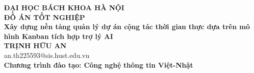 \documentclass[DoAn.tex]{subfiles}
\begin{document}
\begin{titlepage}
\thispagestyle{empty}
\begin{center}

{\textbf{\large{ĐẠI HỌC BÁCH KHOA HÀ NỘI}}}\\[3cm]

{\textbf{\huge{ ĐỒ ÁN TỐT NGHIỆP}}}\\[1cm]
{\textbf{\Large{Xây dựng nền tảng quản lý dự án cộng tác thời gian thực dựa trên mô hình Kanban tích hợp trợ lý AI}}}\\[1cm]

{\textbf{\large{TRỊNH HỮU AN}}}\\
{\large{an.th225593@sis.hust.edu.vn}}\\[0.4cm]

{\textbf{\large{Chương trình đào tạo: Công nghệ thông tin Việt-Nhật}}}\\

\vspace{4cm}
\begin{table}[H]
\centering
{}
\end{table}
\end{center}

\end{titlepage}
\end{document}
